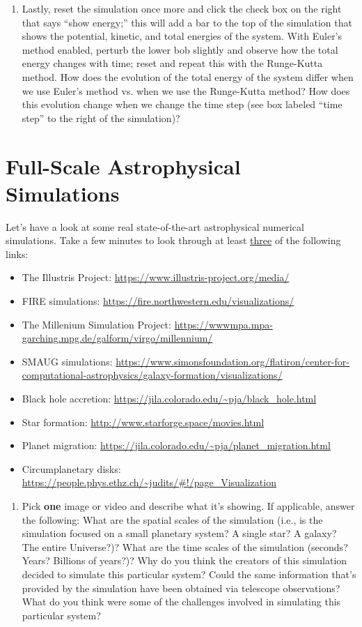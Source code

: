 \documentclass[11pt]{article}
\begin{document}
\begin{enumerate}
\item Lastly, reset the simulation once more and click the check box on the right that says ``show energy;'' this will add a bar to the top of the simulation that shows the potential, kinetic, and total energies of the system. With Euler's method enabled, perturb the lower bob slightly and observe how the total energy changes with time; reset and repeat this with the Runge-Kutta method. How does the evolution of the total energy of the system differ when we use Euler's method vs. when we use the Runge-Kutta method? How does this evolution change when we change the time step (see box labeled ``time step'' to the right of the simulation)?

\end{enumerate}

\section{Full-Scale Astrophysical Simulations} \label{sec:sims}

\medskip \noindent
Let's have a look at some real state-of-the-art astrophysical numerical simulations. Take a few minutes to look through at least \underline{three} of the following links:
\begin{itemize}
    \item The Illustris Project: \url{https://www.illustris-project.org/media/}
    \item FIRE simulations: \url{https://fire.northwestern.edu/visualizations/}
    \item The Millenium Simulation Project: \url{https://wwwmpa.mpa-garching.mpg.de/galform/virgo/millennium/}
    \item SMAUG simulations: \url{https://www.simonsfoundation.org/flatiron/center-for-computational-astrophysics/galaxy-formation/visualizations/}
    \item Black hole accretion: \url{https://jila.colorado.edu/~pja/black_hole.html}
    \item Star formation: \url{http://www.starforge.space/movies.html}
    \item Planet migration: \url{https://jila.colorado.edu/~pja/planet_migration.html}
    \item Circumplanetary disks: \url{https://people.phys.ethz.ch/~judits/#!/page_Visualization}
\end{itemize}

\begin{enumerate}
    \item Pick \textbf{one} image or video and describe what it's showing. If applicable, answer the following: What are the spatial scales of the simulation (i.e., is the simulation focused on a small planetary system? A single star? A galaxy? The entire Universe?)? What are the time scales of the simulation (seconds? Years? Billions of years?)? Why do you think the creators of this simulation decided to simulate this particular system? Could the same information that's provided by the simulation have been obtained via telescope observations? What do you think were some of the challenges involved in simulating this particular system?
\end{enumerate}
\end{document}
